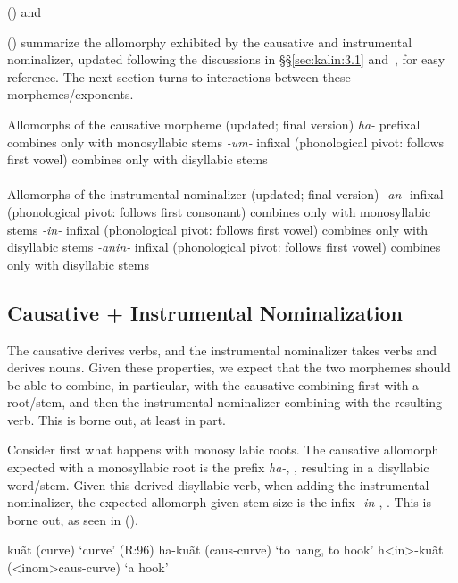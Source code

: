 \documentclass[output=paper]{langscibook}
\newcounter{nexttmp}    %
\newcounter{nnexttmp}   %
\newcommand{\Next}{\setcounter{nexttmp}{\value{equation}}\stepcounter{nexttmp}(\thenexttmp)\xspace}
\newcommand{\NNext}{\setcounter{nnexttmp}{\value{equation}}\addtocounter{nnexttmp}{2}(\thennexttmp)\xspace}
\begin{document}
\Next and \NNext summarize the allomorphy exhibited by the causative and instrumental nominalizer, updated following the discussions in \S\S\ref{sec:kalin:3.1} and~, for easy reference. The next section turns to interactions between these morphemes/exponents.

\ea Allomorphs of the causative morpheme (updated; final version) \label{kalincausallos2}
\ea \textit{ha-}
\ea  prefixal
\ex combines only with monosyllabic stems
\z
\ex \textit{-um-} \label{kalincausallosb2}
\ea infixal (phonological pivot: follows first vowel)
\ex combines only with disyllabic stems\\~\\
\z
\z
\ex Allomorphs of the instrumental nominalizer (updated; final version)  \label{kalininstallos2}
\ea \textit{-an-} \label{kalininstallosb2}
\ea  infixal (phonological pivot: follows first consonant)
\ex combines only with monosyllabic stems
\z
\ex \textit{-in-} \label{kalininstallosa2}
\ea infixal (phonological pivot: follows first vowel)
\ex combines only with disyllabic stems
\z
\ex \textit{-anin-} \label{kalininstallosc2}
\ea infixal (phonological pivot: follows first vowel)
\ex combines only with disyllabic stems
\z
\z
\z

\subsection{Causative + Instrumental Nominalization}\label{sec:kalin:3.4}

The causative derives verbs, and the instrumental nominalizer takes verbs and derives nouns. Given these properties, we expect that the two morphemes should be able to combine, in particular, with the causative combining first with a root/stem, and then the instrumental nominalizer combining with the resulting verb. This is borne out, at least in part. 

Consider first what happens with monosyllabic roots. The causative allomorph expected with a monosyllabic root is the prefix \textit{ha-}, , resulting in a disyllabic word/stem. Given this derived disyllabic verb, when adding the instrumental nominalizer, the expected allomorph given stem size is the infix \textit{-in-}, . This is borne out, as seen in \Next.

\ea 
\ea ku\~at (curve) \hfill `curve'  (R:96)
\ex ha-ku\~at ({\sc caus-}curve) \hfill `to hang, to hook'
\ex\label{kalininstcaus} h<in>-ku\~at ({\sc <inom>caus-}curve) \hfill `a hook'
\z
\z
\end{document}
